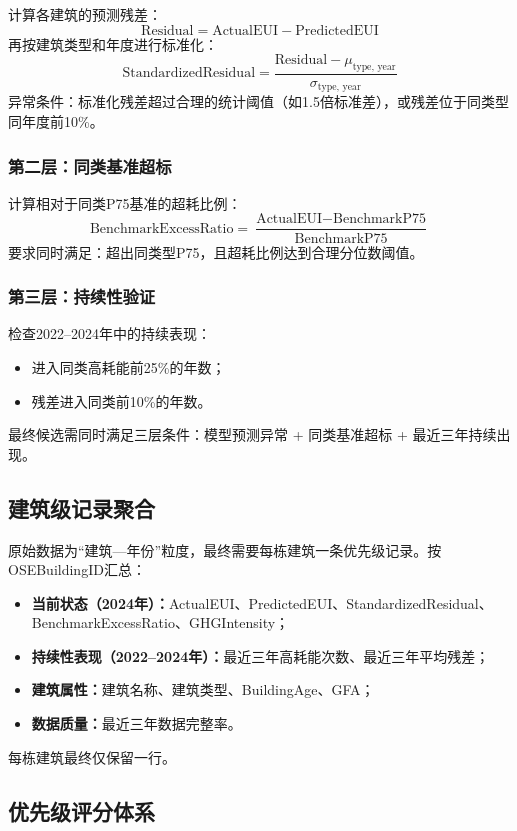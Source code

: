 计算各建筑的预测残差：
\[\text{Residual} = \text{ActualEUI} - \text{PredictedEUI}\]
再按建筑类型和年度进行标准化：
\[\text{StandardizedResidual} = \frac{\text{Residual} - \mu_{\text{type, year}}}{\sigma_{\text{type, year}}}\]
异常条件：标准化残差超过合理的统计阈值（如1.5倍标准差），或残差位于同类型同年度前10\%。

\subsubsection{第二层：同类基准超标}

计算相对于同类P75基准的超耗比例：
\[\text{BenchmarkExcessRatio} = \frac{\text{ActualEUI} - \text{BenchmarkP75}}{\text{BenchmarkP75}}\]
要求同时满足：超出同类型P75，且超耗比例达到合理分位数阈值。

\subsubsection{第三层：持续性验证}

检查2022--2024年中的持续表现：
\begin{itemize}
    \item 进入同类高耗能前25\%的年数；
    \item 残差进入同类前10\%的年数。
\end{itemize}
最终候选需同时满足三层条件：模型预测异常 + 同类基准超标 + 最近三年持续出现。

\subsection{建筑级记录聚合}

原始数据为``建筑—年份''粒度，最终需要每栋建筑一条优先级记录。按OSEBuildingID汇总：
\begin{itemize}
    \item \textbf{当前状态（2024年）：}ActualEUI、PredictedEUI、StandardizedResidual、BenchmarkExcessRatio、GHGIntensity；
    \item \textbf{持续性表现（2022--2024年）：}最近三年高耗能次数、最近三年平均残差；
    \item \textbf{建筑属性：}建筑名称、建筑类型、BuildingAge、GFA；
    \item \textbf{数据质量：}最近三年数据完整率。
\end{itemize}

每栋建筑最终仅保留一行。

\subsection{优先级评分体系}

